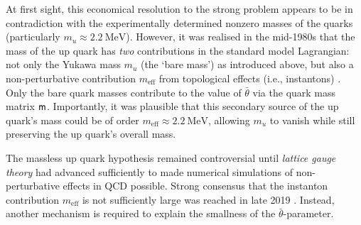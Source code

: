 At first sight, this economical resolution to the strong \CP problem appears to be in contradiction with the experimentally determined nonzero masses of the quarks (particularly $m_u \approx \SI{2.2}{\mega\eV}$).
However, it was realised in the mid-1980s that the mass of the up quark has \emph{two} contributions in the standard model Lagrangian: not only the Yukawa mass $m_u$ (the `bare mass') as introduced above, but also a non-perturbative contribution $m_\text{eff}$ from topological effects (i.e., instantons) \cite{ruling-out-massless-uquark_2020}.
Only the bare quark masses contribute to the value of $\bar θ$ via the quark mass matrix $\mathsf{m}$.
Importantly, it was plausible that this secondary source of the up quark's mass could be of order $m_\text{eff} \approx \SI{2.2}{\mega\eV}$, allowing $m_u$ to vanish while still preserving the up quark's overall mass.

The massless up quark hypothesis remained controversial until \emph{lattice gauge theory} had advanced sufficiently to made numerical simulations of non-perturbative effects in QCD possible.
Strong consensus that the instanton contribution $m_\text{eff}$ is not sufficiently large was reached in late 2019 \cite{ruling-out-massless-uquark_2015,aoki2016review,ruling-out-massless-uquark_2020}.
Instead, another mechanism is required to explain the smallness of the $\bar θ$-parameter.

